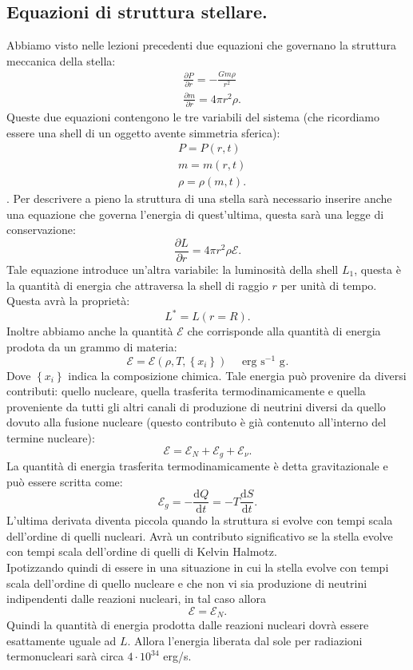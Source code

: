 \subsection{Equazioni di struttura stellare.}
\label{subsec:Equazioni di struttura stellare.}
Abbiamo visto nelle lezioni precedenti due equazioni che governano la struttura meccanica della stella:
\[\begin{aligned}
	&\frac{\partial P}{\partial r} = - \frac{G m \rho }{r^2}\\
	&\frac{\partial m}{\partial r} = 4\pi r^2\rho 
.\end{aligned}\]
Queste due equazioni contengono le tre variabili del sistema (che ricordiamo essere una shell di un oggetto avente simmetria sferica):
\[\begin{aligned}
	&P=P(r,t)\\
	&m=m(r,t)\\
	&\rho =\rho (m,t)
.\end{aligned}\].
Per descrivere a pieno la struttura di una stella sarà necessario inserire anche una equazione che governa l'energia di quest'ultima, questa sarà una legge di conservazione:
\[
	\frac{\partial L}{\partial r} = 4\pi r^2 \rho \mathcal{E}
.\] 
Tale equazione introduce un'altra variabile: la luminosità della shell $L_1$, questa è la quantità di energia che attraversa la shell di raggio $r$ per unità di tempo. Questa avrà la proprietà:
\[
	L^* = L(r=R)
.\] 
Inoltre abbiamo anche la quantità $\mathcal{E}$  che corrisponde alla quantità di energia prodota da un grammo di materia:
\[
	\mathcal{E}  = \mathcal{E}(\rho , T , \left\{ x_i \right\} ) \quad \text{ erg s}^{-1} \text{ g}^{}
.\] 
Dove $\left\{ x_i \right\} $ indica la composizione chimica. Tale energia può provenire da diversi contributi: quello nucleare, quella trasferita termodinamicamente e quella proveniente da tutti gli altri canali di produzione di neutrini diversi da quello dovuto alla fusione nucleare (questo contributo è già contenuto all'interno  del termine nucleare):
\[
	\mathcal{E}  = \mathcal{E}_N+\mathcal{E}_g +\mathcal{E}_{\nu} 
.\] 
La quantità di energia trasferita termodinamicamente è detta gravitazionale e può essere scritta come:
\[
	\mathcal{E}_g = - \frac{\mbox{d} Q}{\mbox{d} t} = - T \frac{\mbox{d} S}{\mbox{d} t} 
.\] 
L'ultima derivata diventa piccola quando la struttura si evolve con tempi scala dell'ordine di quelli nucleari. Avrà un contributo significativo se la stella evolve con tempi scala dell'ordine di quelli di Kelvin Halmotz.\\
Ipotizzando quindi di essere in una situazione in cui la stella evolve con tempi scala dell'ordine di quello nucleare e che non vi sia produzione di neutrini indipendenti dalle reazioni nucleari, in tal caso allora
\[
	\mathcal{E}  = \mathcal{E}_N
.\] 
Quindi la quantità di energia prodotta dalle reazioni nucleari dovrà essere esattamente uguale ad $L$. Allora l'energia liberata dal sole per radiazioni termonucleari sarà circa $4 \cdot 10^{34} $ erg/s.
